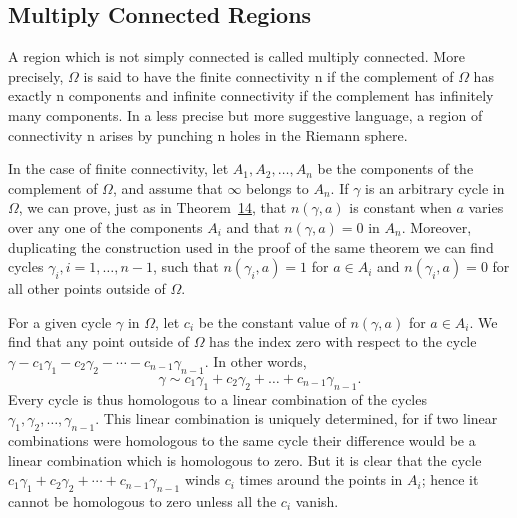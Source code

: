\setcounter{section}{4}\setcounter{subsection}{6}\subsection{Multiply Connected Regions}\label{sec:4.4.7}
A region which is not simply connected is called multiply connected. More precisely, $\Omega$ is said to have the finite connectivity n if the complement of $\Omega$ has exactly n components and infinite connectivity if the complement has infinitely many components. In a less precise but more suggestive language, a region of connectivity n arises by punching n holes in the Riemann sphere.

In the case of finite connectivity, let $A_1, A_2, \ldots, A_n$ be the components of the complement of $\Omega$, and assume that $\infty$ belongs to $A_n$. If $\gamma$ is an arbitrary cycle in $\Omega$, we can prove, just as in Theorem~\hyperref[thm:4.14]{14}, that $n(\gamma, a)$ is constant when $a$ varies over any one of the components $A_i$ and that $n(\gamma, a) = 0$ in $A_n$. Moreover, duplicating the construction used in the proof of the same theorem we can find cycles $\gamma_i, i = 1, \ldots, n - 1$, such that $n(\gamma_i, a) = 1$ for $a \in A_i$ and $n(\gamma_i, a) = 0$ for all other points outside of $\Omega$.


For a given cycle $\gamma$ in $\Omega$, let $c_i$ be the constant value of $n(\gamma, a)$ for $a \in A_i$. We find that any point outside of $\Omega$ has the index zero with respect to the cycle $\gamma - c_1 \gamma_1 - c_2 \gamma_2 - \cdots - c_{n-1} \gamma_{n-1}$. In other words,
\begin{equation*}
\gamma \sim c _ {1} \gamma_ {1} + c _ {2} \gamma_ {2} + \dots + c _ {n - 1} \gamma_ {n - 1}.
\end{equation*}
Every cycle is thus homologous to a linear combination of the cycles $\gamma_{1}, \gamma_{2}, \ldots, \gamma_{n-1}$. This linear combination is uniquely determined, for if two linear combinations were homologous to the same cycle their difference would be a linear combination which is homologous to zero. But it is clear that the cycle $c_{1}\gamma_{1} + c_{2}\gamma_{2} + \cdots + c_{n-1}\gamma_{n-1}$ winds $c_{i}$ times around the points in $A_{i}$; hence it cannot be homologous to zero unless all the $c_{i}$ vanish.

